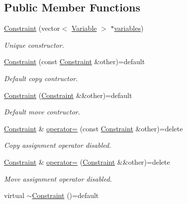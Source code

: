\subsection*{Public Member Functions}
\begin{DoxyCompactItemize}
\item 
\hyperlink{classghost_1_1Constraint_a2b66b2953a7b3d81e6f215ea4e5e0294}{Constraint} (vector$<$ \hyperlink{classghost_1_1Variable}{Variable} $>$ $\ast$\hyperlink{classghost_1_1Constraint_a1730b1b54d03d221e6e2a95185a2184b}{variables})
\begin{DoxyCompactList}\small\item\em Unique constructor. \end{DoxyCompactList}\item 
\hyperlink{classghost_1_1Constraint_a12f4e85434d02d6fe0a2a95fa7ff6a56}{Constraint} (const \hyperlink{classghost_1_1Constraint}{Constraint} \&other)=default
\begin{DoxyCompactList}\small\item\em Default copy contructor. \end{DoxyCompactList}\item 
\hyperlink{classghost_1_1Constraint_af90f09c362cb7eea3f92ed2814f26f20}{Constraint} (\hyperlink{classghost_1_1Constraint}{Constraint} \&\&other)=default
\begin{DoxyCompactList}\small\item\em Default move contructor. \end{DoxyCompactList}\item 
\hyperlink{classghost_1_1Constraint}{Constraint} \& \hyperlink{classghost_1_1Constraint_a002177e11deecee2db240c9ff4647008}{operator=} (const \hyperlink{classghost_1_1Constraint}{Constraint} \&other)=delete
\begin{DoxyCompactList}\small\item\em Copy assignment operator disabled. \end{DoxyCompactList}\item 
\hyperlink{classghost_1_1Constraint}{Constraint} \& \hyperlink{classghost_1_1Constraint_a2d220b6c65e9c5456bdbc49944a0b52c}{operator=} (\hyperlink{classghost_1_1Constraint}{Constraint} \&\&other)=delete
\begin{DoxyCompactList}\small\item\em Move assignment operator disabled. \end{DoxyCompactList}\item 
virtual \hyperlink{classghost_1_1Constraint_aebea8263c24d0c3a5328c20ee0006f32}{$\sim$\+Constraint} ()=default

\end{DoxyCompactItemize}
